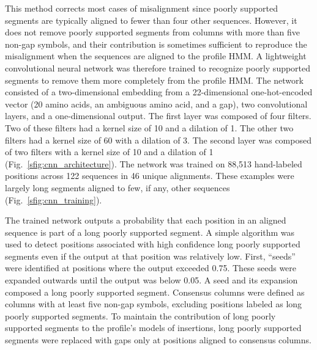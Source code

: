This method corrects most cases of misalignment since poorly supported segments are typically aligned to fewer than four other sequences. However, it does not remove poorly supported segments from columns with more than five non-gap symbols, and their contribution is sometimes sufficient to reproduce the misalignment when the sequences are aligned to the profile HMM. A lightweight convolutional neural network was therefore trained to recognize poorly supported segments to remove them more completely from the profile HMM. The network consisted of a two-dimensional embedding from a 22-dimensional one-hot-encoded vector (20 amino acids, an ambiguous amino acid, and a gap), two convolutional layers, and a one-dimensional output. The first layer was composed of four filters. Two of these filters had a kernel size of 10 and a dilation of 1. The other two filters had a kernel size of 60 with a dilation of 3. The second layer was composed of two filters with a kernel size of 10 and a dilation of 1 (Fig.~\ref{sfig:cnn_architecture}). The network was trained on 88,513 hand-labeled positions across 122 sequences in 46 unique alignments. These examples were largely long segments aligned to few, if any, other sequences (Fig.~\ref{sfig:cnn_training}).

The trained network outputs a probability that each position in an aligned sequence is part of a long poorly supported segment. A simple algorithm was used to detect positions associated with high confidence long poorly supported segments even if the output at that position was relatively low. First, “seeds” were identified at positions where the output exceeded 0.75. These seeds were expanded outwards until the output was below 0.05. A seed and its expansion composed a long poorly supported segment. Consensus columns were defined as columns with at least five non-gap symbols, excluding positions labeled as long poorly supported segments. To maintain the contribution of long poorly supported segments to the profile’s models of insertions, long poorly supported segments were replaced with gaps only at positions aligned to consensus columns.

